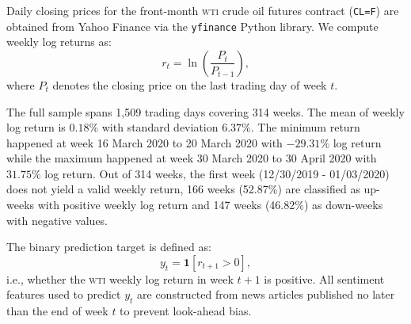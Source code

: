 \documentclass[preprint,12pt,authoryear]{elsarticle}
\newcommand{\wti}{\textsc{wti}}
\begin{document}
Daily closing prices for the front-month \wti{} crude oil futures contract (\texttt{CL=F}) are obtained from Yahoo Finance via the \texttt{yfinance} Python library.
We compute weekly log returns as:
\begin{equation}
    r_t = \ln\!\left(\frac{P_t}{P_{t-1}}\right),
    \label{eq:weekly_return}
\end{equation}
where $P_t$ denotes the closing price on the last trading day of week $t$.

The full sample spans 1,509 trading days covering 314 weeks. The mean of weekly log return is $0.18\%$ with standard deviation $6.37\%$. The minimum return happened at week 16 March 2020 to 20 March 2020 with $-29.31\%$ log return while the maximum happened at week 30 March 2020 to 30 April 2020 with $31.75\%$ log return. Out of 314 weeks, the first week (12/30/2019 - 01/03/2020) does not yield a valid weekly return, 166 weeks (52.87\%) are classified as up-weeks with positive weekly log return and 147 weeks (46.82\%) as down-weeks with negative values. 

The binary prediction target is defined as:
\begin{equation}
    y_t = \mathbf{1}\!\left[r_{t+1} > 0\right],
\end{equation}
i.e., whether the \wti{} weekly log return in week $t+1$ is positive.
All sentiment features used to predict $y_t$ are constructed from news
articles published no later than the end of week $t$ to prevent
look-ahead bias.


\end{document}
